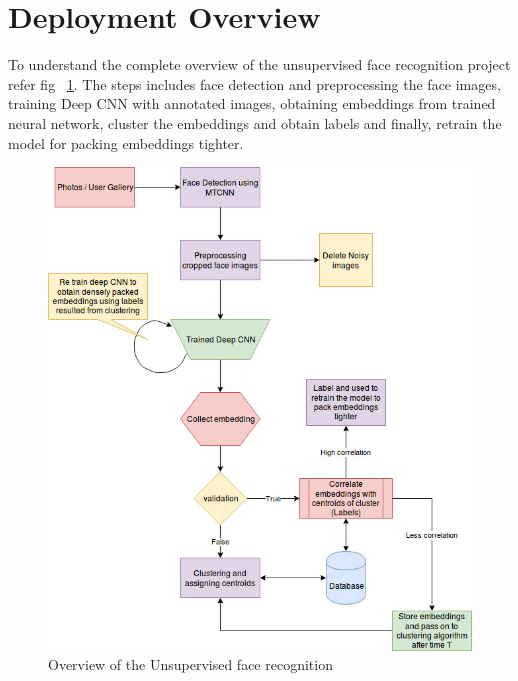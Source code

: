 \documentclass[a4paper,12pt, twoside]{NITKReport}
\begin{document}
\section{Deployment Overview}
To understand the complete overview of the unsupervised face recognition project refer fig ~\ref{overview}. The steps includes face detection and preprocessing the face images, training Deep CNN with annotated images, obtaining embeddings from trained neural network, cluster the embeddings and obtain labels and finally, retrain the model for packing embeddings tighter.

\begin{figure} [h]
    \includegraphics[height=\textheight,width=\textwidth]{overview.jpg}
    \caption{Overview of the Unsupervised face recognition}
    \label{overview}
\end{figure}
\end{document}
